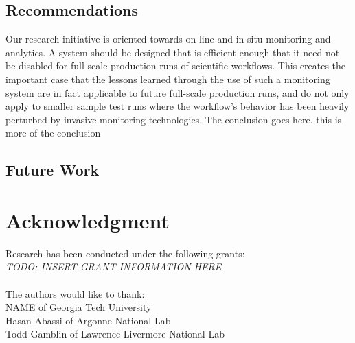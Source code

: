 \documentclass[10pt, conference, compsocconf]{IEEEtran}
\begin{document}
\subsection{Recommendations}
Our research initiative is oriented towards on line and in 
situ monitoring and  analytics. A system should be designed that is efficient 
enough that it need not 
be disabled for full-scale production runs of scientific workflows. This creates 
the important case that the lessons learned through the use of such a 
monitoring system are in fact applicable to future full-scale production runs, 
and do not only apply to smaller sample test runs where the workflow's behavior 
has been heavily perturbed by invasive monitoring technologies.
The conclusion goes here. this is more of the conclusion
\subsection{Future Work}

\section*{Acknowledgment}
Research has been conducted under the following grants:\\
\textit{TODO: INSERT GRANT INFORMATION HERE}\\
\\
The authors would like to thank:\\
NAME of Georgia Tech University\\
Hasan Abassi of Argonne National Lab\\
Todd Gamblin of Lawrence Livermore National Lab


\end{document}
